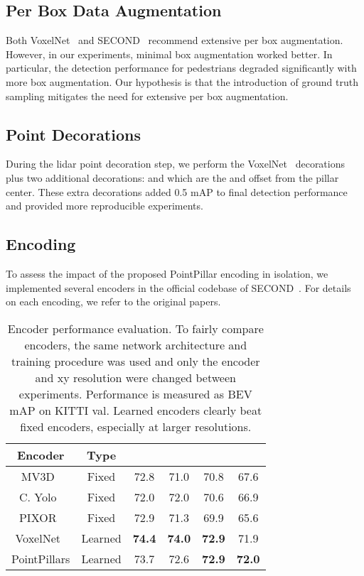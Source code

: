 \documentclass[10pt,twocolumn,letterpaper]{article}
\newcommand{\squeeze}{\vspace{-0.5mm}}
\begin{document}
\squeeze
\subsection{Per Box Data Augmentation}
\squeeze
\label{sec:box_aug}
Both VoxelNet~\cite{voxelnet} and SECOND~\cite{second} recommend extensive per box augmentation.
However, in our experiments, minimal box augmentation worked better.
In particular, the detection performance for pedestrians degraded significantly with more box augmentation.
Our hypothesis is that the introduction of ground truth sampling mitigates the need for extensive per box augmentation.

\squeeze
\subsection{Point Decorations}
\squeeze
\label{sec:decoration}
During the lidar point decoration step, we perform the VoxelNet~\cite{voxelnet} decorations plus two additional decorations:
 and  which are the  and  offset from the pillar  center.
These extra decorations added 0.5 mAP to final detection performance and provided more reproducible experiments.

\squeeze
\subsection{Encoding}
\squeeze
\label{sec:encoding}
To assess the impact of the proposed PointPillar encoding in isolation, we implemented several encoders in the official codebase of SECOND~\cite{second}.
For details on each encoding, we refer to the original papers.
\begin{table}[]
\small
\begin{tabular}{*{6}{| c} |}
\hline
\textbf{Encoder} 				& \textbf{Type}		&  		&  		& 		& 		\\ \hline \hline 
MV3D~\cite{mv3d}				& Fixed			& 72.8				& 71.0				& 70.8			& 67.6			\\ \hline
C. Yolo~\cite{complexyolo}		& Fixed			& 72.0		    		& 72.0				& 70.6			& 66.9			\\ \hline
PIXOR~\cite{pixor} 				& Fixed			& 72.9		    		& 71.3				& 69.9			& 65.6			\\ \hline \hline
VoxelNet~\cite{voxelnet}			& Learned			& \textbf{74.4}				& \textbf{74.0}				& \textbf{72.9}			& 71.9 	\\ \hline
PointPillars					& Learned			& 73.7				& 72.6				& \textbf{72.9}			& \textbf{72.0}			\\ \hline
\end{tabular}
\caption{Encoder performance evaluation.
To fairly compare encoders, the same network architecture and training procedure was used and only the encoder and xy resolution were changed between experiments.
Performance is measured as BEV mAP on KITTI val.
Learned encoders clearly beat fixed encoders, especially at larger resolutions.
}
\label{table:encode}
\end{table}
\end{document}
